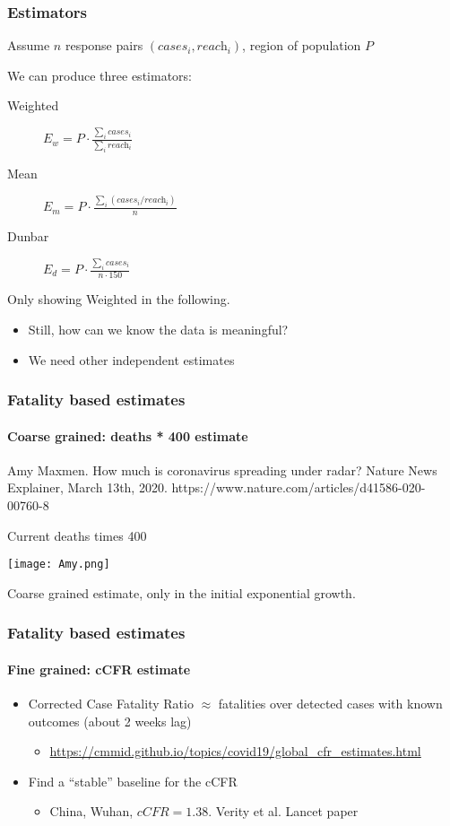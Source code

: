 \documentclass{beamer}
\begin{document}
\begin{frame}
  \frametitle{Estimators}
  Assume $n$ response pairs $(\textit{cases}_i,\textit{reach}_i)$, region of population $P$  

  We can produce three estimators: 
  \begin{description}
    \item[Weighted] $E_w  =  P \cdot \frac{\sum_{i} \textit{cases}_i}{\sum_{i} \textit{reach}_i}$  
    \item[Mean] $E_m  =  P \cdot \frac{\sum_i (\textit{cases}_i / \textit{reach}_i)}{n}$
    \item[Dunbar] $E_d  =  P \cdot \frac{\sum_{i} \textit{cases}_i}{n \cdot 150}$
  \end{description}
  Only showing  Weighted in the following. 


  \begin{itemize}
    \item Still, how can we know the data is meaningful?   
    \item We need other independent estimates 
  \end{itemize}


\end{frame}



\begin{frame}
  \frametitle{Fatality based estimates}
  \framesubtitle{Coarse grained: deaths * 400 estimate}
  Amy Maxmen. How much is coronavirus spreading under radar? 
  Nature News Explainer, March 13th, 2020. https://www.nature.com/articles/d41586-020-00760-8

  \begin{block}{Current deaths times 400}
  \begin{center}
  \texttt{[image: Amy.png]}
  \end{center}
  \end{block}
  Coarse grained estimate, only in the initial exponential growth. 
\end{frame}

\begin{frame}
  \frametitle{Fatality based estimates}
  \framesubtitle{Fine grained: cCFR estimate}
  \begin{itemize}
    \item Corrected Case Fatality Ratio $\approx$ fatalities over detected cases with known outcomes (about 2 weeks lag)
      \begin{itemize}
      \item \url{https://cmmid.github.io/topics/covid19/global_cfr_estimates.html}
      \end{itemize}

    \item Find a ``stable'' baseline for the cCFR 
      \begin{itemize}
        \item China, Wuhan, $cCFR=1.38$.  Verity et al. Lancet paper
      \end{itemize}
  \end{itemize}
\end{frame}
\end{document}
